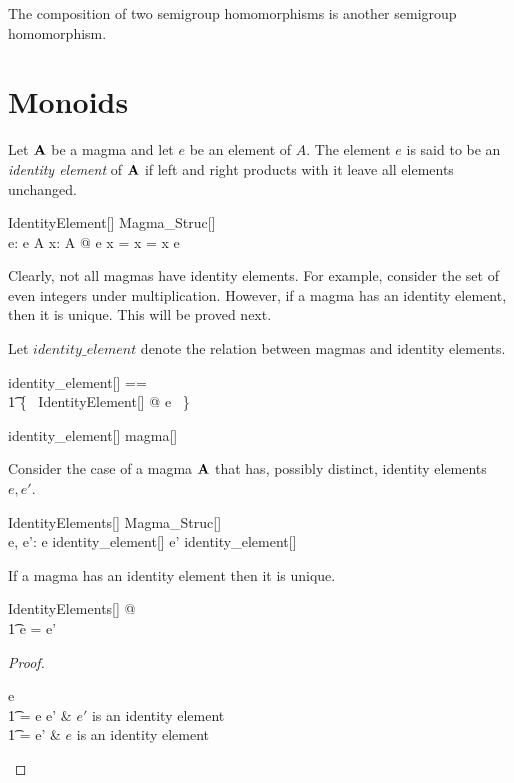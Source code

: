 \documentclass{amsart}
\begin{document}
\begin{remark}
The composition of two semigroup homomorphisms is another semigroup homomorphism.
\end{remark}

\section{Monoids}

Let $\mathbf{A}$ be a magma and let $e$ be an element of $A$.
The element $e$ is said to be an \textit{identity element} of $\mathbf{A}$ if left and right 
products with it leave all elements unchanged.

\begin{schema}{IdentityElement}[\genT]
	Magma\_Struc[\genT] \\
	e: \genT
\where
	e \in A
\also
	\forall x: A @ e \opG x = x = x \opG e
\end{schema}

Clearly, not all magmas have identity elements.
For example, consider the set of even integers under multiplication.
However, if a magma has an identity element, then it is unique.
This will be proved next.

Let $identity\_element$ denote the relation between magmas and identity elements.
\begin{zed}
	identity\_element[\genT] == \\
	\t1	\{~ IdentityElement[\genT] @ \strucA \mapsto e ~\}
\end{zed}

\begin{remark}
\begin{zed}
	identity\_element[\setT] \in magma[\setT] \rel \setT
\end{zed}
\end{remark}

Consider the case of a magma $\mathbf{A}$ that has, possibly distinct, identity elements $e, e'$.
\begin{schema}{IdentityElements}[\genT]
	Magma\_Struc[\genT] \\
	e, e': \genT
\where
	\strucA \mapsto e \in identity\_element[\genT]
\also
	\strucA \mapsto e' \in identity\_element[\genT]
\end{schema}

\begin{remark}
If a magma has an identity element then it is unique.

\begin{zed}
	\forall IdentityElements[\setT] @ \\
	\t1	e = e'
\end{zed}

\begin{proof}
\begin{argue}
e \\
\t1	= e \opG e'	& $e'$ is an identity element \\
\t1	= e'			& $e$ is an identity element
\end{argue}
\end{proof}

\end{remark}
\end{document}
